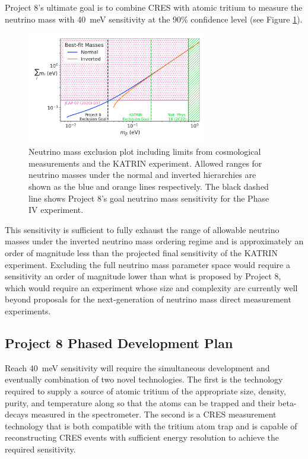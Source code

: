 Project 8's ultimate goal is to combine CRES with atomic tritium to measure the neutrino mass with 40~meV sensitivity at the 90\% confidence level (see Figure \ref{fig:chap3-p8-nu-mass-goal}).
\begin{figure}[htbp]
    \centering
    \includegraphics[width=0.7\textwidth]{figs/Chapter-3/230303_sum_nu_mass_vs_m_beta_with_exclusion_and_goal.png}
    \caption{Neutrino mass exclusion plot including limits from cosmological measurements and the KATRIN experiment. Allowed ranges for neutrino masses under the normal and inverted hierarchies are shown as the blue and orange lines respectively. The black dashed line shows Project 8's goal neutrino mass sensitivity for the Phase IV experiment.}
    \label{fig:chap3-p8-nu-mass-goal}
\end{figure}
This sensitivity is sufficient to fully exhaust the range of allowable neutrino masses under the inverted neutrino mass ordering regime and is approximately an order of magnitude less than the projected final sensitivity of the KATRIN experiment. Excluding the full neutrino mass parameter space would require a sensitivity an order of magnitude lower than what is proposed by Project 8, which would require an experiment whose size and complexity are currently well beyond proposals for the next-generation of neutrino mass direct measurement experiments.

\subsection{Project 8 Phased Development Plan}

Reach 40~meV sensitivity will require the simultaneous development and eventually combination of two novel technologies. The first is the technology required to supply a source of atomic tritium of the appropriate size, density, purity, and temperature along so that the atoms can be trapped and their beta-decays measured in the spectrometer. The second is a CRES measurement technology that is both compatible with the tritium atom trap and is capable of reconstructing CRES events with sufficient energy resolution to achieve the required sensitivity.

